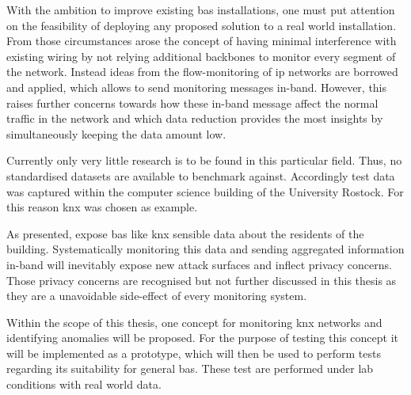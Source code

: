 With the ambition to improve existing \gls{bas} installations, one must put attention on the feasibility of deploying any proposed solution to a real world installation. From those circumstances arose the concept of having minimal interference with existing wiring by not relying additional backbones to monitor every segment of the network. Instead ideas from the flow-monitoring of \gls{ip} networks are borrowed and applied, which allows to send monitoring messages in-band.
However, this raises further concerns towards how these in-band message affect the normal traffic in the network and which data reduction provides the most insights by simultaneously keeping the data amount low.

Currently only very little research is to be found in this particular field. 
Thus, no standardised datasets are available to benchmark against. Accordingly test data was captured within the computer science building of the University Rostock. For this reason \gls{knx} was chosen as example.

As \textcite{Mundt2012} presented, expose \gls{bas} like \gls{knx} sensible data about the residents of the building. Systematically monitoring this data and sending aggregated information in-band will inevitably expose new attack surfaces and inflect privacy concerns.
Those privacy concerns are recognised but not further discussed in this thesis as they are a unavoidable side-effect of every monitoring system.

Within the scope of this thesis, one concept for monitoring \gls{knx} networks and identifying anomalies will be proposed. For the purpose of testing this concept it will be implemented as a prototype, which will then be used to perform tests regarding its suitability for general \gls{bas}. These test are performed under lab conditions with real world data.

